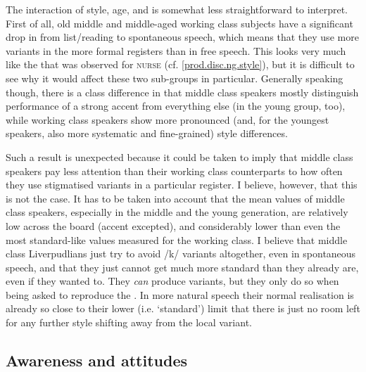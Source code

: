 The interaction of style, age, and  is somewhat less straightforward to interpret.
First of all, old middle and middle-aged working class subjects have a significant drop in  from list/reading to spontaneous speech, which means that they use more  variants in the more formal registers than in free speech.
This looks very much like the  that was observed for \textsc{nurse} (cf. \ref{prod.disc.ng.style}), but it is difficult to see why it would affect these two sub-groups in particular.
Generally speaking though, there is a class difference in that middle class speakers mostly distinguish performance of a strong accent from everything else (in the young group, too), while working class speakers show more pronounced (and, for the youngest speakers, also more systematic and fine-grained) style differences.

Such a result is unexpected because it could be taken to imply that middle class speakers pay less attention than their working class counterparts to how often they use stigmatised variants in a particular register.
I believe, however, that this is not the case.
It has to be taken into account that the mean  values of middle class speakers, especially in the middle and the young generation, are relatively low across the board (accent  excepted), and considerably lower than even the most standard-like values measured for the working class.
I believe that middle class Liverpudlians just try to avoid  /k/ variants altogether, even in spontaneous speech, and that they just cannot get much more standard than they already are, even if they wanted to.
They \emph{can} produce  variants, but they only do so when being asked to reproduce the .
In more natural speech their normal realisation is already so close to their lower (i.e. `standard') limit that there is just no room left for any further style shifting away from the local variant.

\subsection{Awareness and attitudes}
\label{prod.disc.k.aware}


